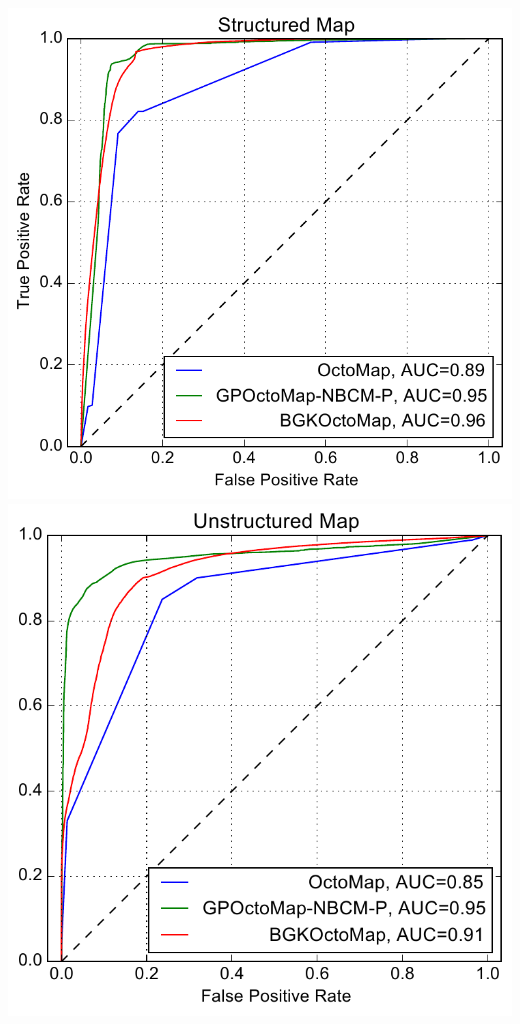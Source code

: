 \documentclass[portrait,final,archD,fontscale=0.477]{baposter}
\begin{document}
\begin{poster}
{\begin{multicols}{2}
{
\includegraphics[width=0.468\linewidth]{img/sim_structured_roc}
\includegraphics[width=0.45\linewidth]{img/sim_unstructured_roc} 
}

\end{multicols}

}


\end{poster}
\end{document}
